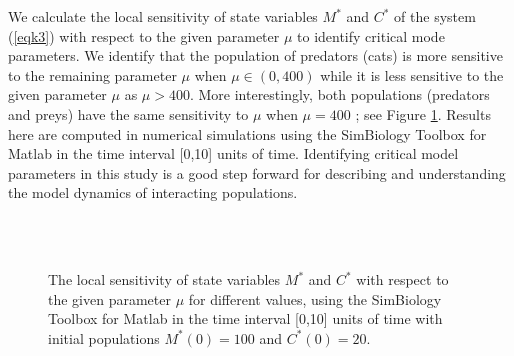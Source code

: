 \documentclass[a4paper,12pt]{article}
\begin{document}
We calculate the local sensitivity of state variables $M^{*}$ and $C^{*}$ of the system (\ref{eqk3}) with respect to the given parameter $\mu$ to identify critical mode parameters. We identify that the population of predators (cats) is more sensitive to the remaining parameter $\mu$ when $\mu \in (0 , 400)$ while it is less sensitive to the given parameter $\mu$ as $\mu > 400$. More interestingly, both populations (predators and preys) have the same sensitivity to $\mu$ when $\mu=400$ ; see Figure \ref{S1}.
Results here are computed in numerical simulations using the SimBiology Toolbox for Matlab in the time interval [0,10] units of time. Identifying critical model parameters in this study is a good step forward for describing and understanding the model dynamics of interacting populations.  
\clearpage
\begin{figure}[ht]          
      \begin{center}    
        \\
        \\
    \end{center}         
\caption {The local sensitivity of state variables $M^{*}$ and $C^{*}$ with respect to the given parameter
$\mu$ for different values, using the SimBiology Toolbox for Matlab in the time interval [0,10]
units of time with initial populations $M^{*}(0)=100$ and $C^{*}(0)=20$.}  
   \label{S1}    
\end{figure}     

\clearpage
\end{document}
